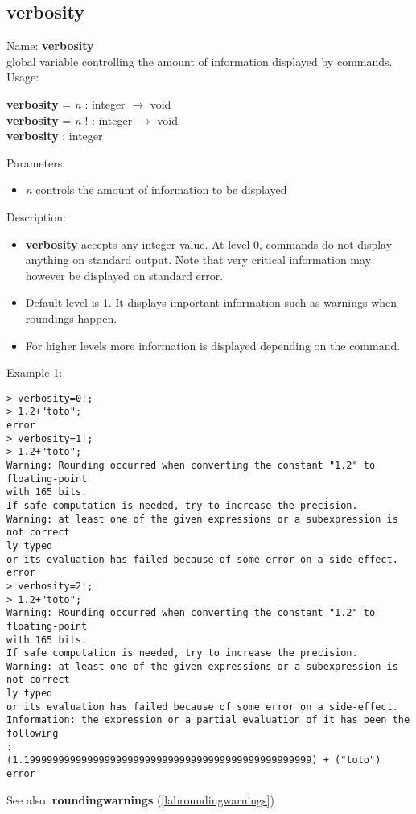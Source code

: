 \subsection{verbosity}
\label{labverbosity}
\noindent Name: \textbf{verbosity}\\
global variable controlling the amount of information displayed by commands.\\
\noindent Usage: 
\begin{center}
\textbf{verbosity} = \emph{n} : \textsf{integer} $\rightarrow$ \textsf{void}\\
\textbf{verbosity} = \emph{n} ! : \textsf{integer} $\rightarrow$ \textsf{void}\\
\textbf{verbosity} : \textsf{integer}\\
\end{center}
Parameters: 
\begin{itemize}
\item \emph{n} controls the amount of information to be displayed
\end{itemize}
\noindent Description: \begin{itemize}

\item \textbf{verbosity} accepts any integer value. At level 0, commands do not display anything
   on standard output. Note that very critical information may however be displayed on
   standard error.

\item Default level is 1. It displays important information such as warnings when 
   roundings happen.

\item For higher levels more information is displayed depending on the command.
\end{itemize}
\noindent Example 1: 
\begin{center}\begin{minipage}{15cm}\begin{Verbatim}[frame=single]
> verbosity=0!;
> 1.2+"toto";
error
> verbosity=1!;
> 1.2+"toto";
Warning: Rounding occurred when converting the constant "1.2" to floating-point 
with 165 bits.
If safe computation is needed, try to increase the precision.
Warning: at least one of the given expressions or a subexpression is not correct
ly typed
or its evaluation has failed because of some error on a side-effect.
error
> verbosity=2!;
> 1.2+"toto";
Warning: Rounding occurred when converting the constant "1.2" to floating-point 
with 165 bits.
If safe computation is needed, try to increase the precision.
Warning: at least one of the given expressions or a subexpression is not correct
ly typed
or its evaluation has failed because of some error on a side-effect.
Information: the expression or a partial evaluation of it has been the following
:
(1.19999999999999999999999999999999999999999999999999) + ("toto")
error
\end{Verbatim}
\end{minipage}\end{center}
See also: \textbf{roundingwarnings} (\ref{labroundingwarnings})
